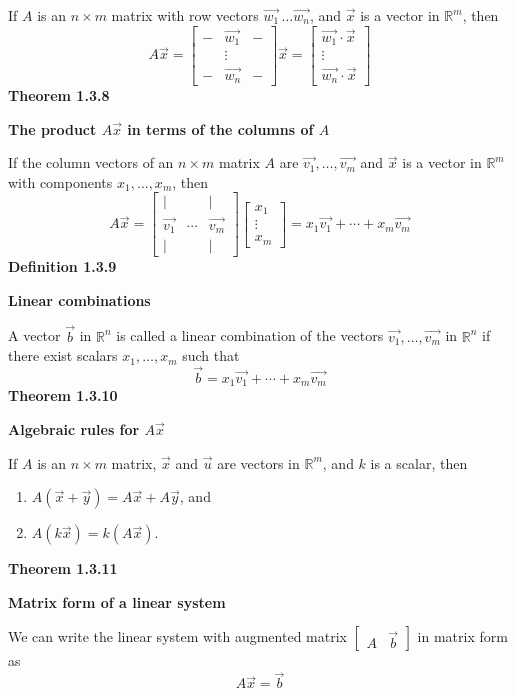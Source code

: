 \par\noindent If $A$ is an $n\times{}m$ matrix with row vectors $\vec{w_{1}}\,\ldots{}\vec{w_{n}}$, and $\vec{x}$ is a vector in $\mathbb{R}^{m}$, then
\[A\vec{x}=\left[\begin{array}{ccc}- & \vec{w_{1}} & -\\ & \vdots & \\ - & \vec{w_{n}} & - \end{array}\right]\vec{x}=\left[\begin{array}{c}\vec{w_{1}}\cdot\vec{x}\\ \vdots\\ \vec{w_{n}}\cdot\vec{x}\end{array}\right]\]
\textbf{Theorem 1.3.8}\\
\par\noindent\textbf{The product $A\vec{x}$ in terms of the columns of $A$}
\par\noindent If the column vectors of an $n\times{}m$ matrix $A$ are $\vec{v_{1}},\ldots{},\vec{v_{m}}$ and $\vec{x}$ is a vector in $\mathbb{R}^{m}$ with components $x_{1},\ldots{},x_{m}$, then
\[A\vec{x}=\left[\begin{array}{ccc}| & & | \\ \vec{v_{1}} & \cdots{} & \vec{v_{m}} \\ | & & |\end{array}\right]\left[\begin{array}{c}x_{1} \\ \vdots{} \\ x_{m}\end{array}\right]=x_{1}\vec{v_{1}}+\cdots{}+x_{m}\vec{v_{m}}\]
\textbf{Definition 1.3.9}\\
\par\noindent\textbf{Linear combinations}
\par\noindent A vector $\vec{b}$ in $\mathbb{R}^{n}$ is called a linear combination of the vectors $\vec{v_{1}},\ldots{},\vec{v_{m}}$ in $\mathbb{R}^{n}$ if there exist scalars $x_{1},\ldots{},x_{m}$ such that
\[\vec{b}=x_{1}\vec{v_{1}}+\cdots{}+x_{m}\vec{v_{m}}\]
\textbf{Theorem 1.3.10}\\
\par\noindent\textbf{Algebraic rules for $A\vec{x}$}
\par\noindent If $A$ is an $n\times{}m$ matrix, $\vec{x}$ and $\vec{u}$ are vectors in $\mathbb{R}^{m}$, and $k$ is a scalar, then
\renewcommand{\labelenumi}{\textbf{\alph{enumi}.}}
\begin{enumerate}
\item $A(\vec{x}+\vec{y})=A\vec{x}+A\vec{y}$, and
\item $A(k\vec{x})=k(A\vec{x})$.
\end{enumerate}
\textbf{Theorem 1.3.11}\\
\par\noindent\textbf{Matrix form of a linear system}
\par\noindent We can write the linear system with augmented matrix $\left[\begin{array}{c|c}A & \vec{b}\end{array}\right]$ in matrix form as
\[A\vec{x}=\vec{b}\]

